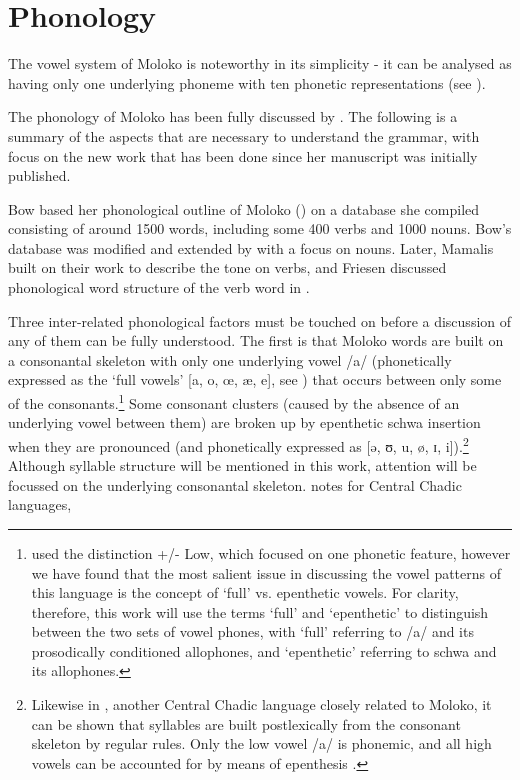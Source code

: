 \chapter[Phonology]{Phonology}\setcounter{equation}{0}\label{chap:2}
\makeatletter{}\makeatother
\hypertarget{RefHeading1210401525720847}{}
The vowel system of Moloko is noteworthy in its simplicity - it can be analysed as having only one underlying phoneme with ten phonetic representations (see ).

The phonology of Moloko has been fully discussed by \citet{Bow1997c}. The following is a summary of the aspects that are necessary to understand the grammar, with focus on the new work that has been done since her manuscript was initially published. 

Bow based her phonological outline of Moloko (\citeyear{Bow1997c}) on a database she compiled consisting of around 1500 words, including some 400 verbs and 1000 nouns.  Bow’s database was modified and extended by \citet{Boyd2002} with a focus on nouns. Later, Mamalis built on their work to describe the tone on verbs, and Friesen discussed phonological word structure of the verb word in \citealt{FriesenMamalis2008}. 

Three inter-related phonological factors must be touched on before a discussion of any of them can be fully understood. The first is that Moloko words are built on a consonantal skeleton with only one underlying vowel /a/ (phonetically expressed as the ‘full vowels’ [a, o, œ, \ae, e], see ) that occurs between only some of the consonants.\footnote{\citet{Bow1997a} used the distinction +/- Low, which focused on one phonetic feature, however we have found that the most salient issue in discussing the vowel patterns of this language is the concept of ‘full’ vs. epenthetic vowels.  For clarity, therefore, this work will use the terms ‘full’ and ‘epenthetic’ to distinguish between the two sets of vowel phones, with ‘full’ referring to /a/ and its prosodically conditioned allophones, and ‘epenthetic’ referring to schwa and its allophones.} Some consonant clusters (caused by the absence of an underlying vowel between them) are broken up by epenthetic schwa insertion when they are pronounced (and phonetically expressed as [ə, ʊ, u, ø, ɪ, i]).\footnote{Likewise in , another Central Chadic language closely related to Moloko, it can be shown that syllables are built postlexically from the consonant skeleton by regular rules. Only the low vowel /a/ is phonemic, and all high vowels can be accounted for by means of epenthesis \citep{Smith1999}.} Although syllable structure will be mentioned in this work, attention will be focussed on the underlying consonantal skeleton. \citet[15]{Roberts2001} notes for Central Chadic languages, 

